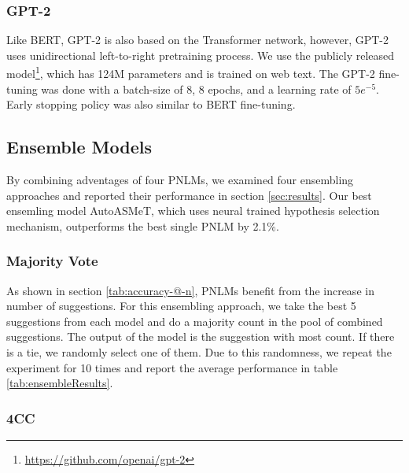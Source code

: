 \documentclass[11pt]{article}
\begin{document}
\subsubsection{GPT-2}

Like BERT, GPT-2 is also based on the Transformer network, however, GPT-2 uses unidirectional left-to-right pretraining process. We use the publicly released model\footnote{\url{https://github.com/openai/gpt-2}}, which has 124M parameters and is trained on web text. The GPT-2 fine-tuning was done with a batch-size of 8, 8 epochs, and a learning rate of $5e^{-5}$. Early stopping policy was also similar to BERT fine-tuning.

\subsection{Ensemble Models} \label{sec:ensemble}

By combining adventages of four PNLMs, we examined four ensembling approaches and reported their performance in section \ref{sec:results}. Our best ensemling model AutoASMeT, which uses neural trained hypothesis selection mechanism, outperforms the best single PNLM by 2.1\%. 

\subsubsection{Majority Vote}

As shown in section \ref{tab:accuracy-@-n}, PNLMs benefit from the increase in number of suggestions. For this ensembling approach, we take the best 5 suggestions from each model and do a majority count in the pool of combined suggestions. The output of the model is the suggestion with most count. If there is a tie, we randomly select one of them. Due to this randomness, we repeat the experiment for 10 times and report the average performance in table \ref{tab:ensembleResults}.

\subsubsection{4CC} \label{sec:4cc}
\end{document}
